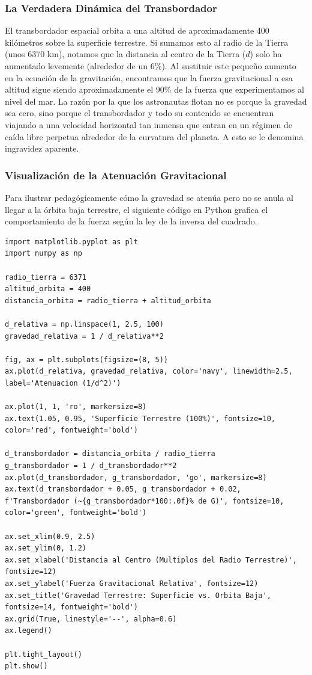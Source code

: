 \documentclass[12pt]{article}
\begin{document}
\subsubsection*{La Verdadera Dinámica del Transbordador}
El transbordador espacial orbita a una altitud de aproximadamente 400 kilómetros sobre la superficie terrestre. Si sumamos esto al radio de la Tierra (unos 6370 km), notamos que la distancia al centro de la Tierra ($d$) solo ha aumentado levemente (alrededor de un 6\%). Al sustituir este pequeño aumento en la ecuación de la gravitación, encontramos que la fuerza gravitacional a esa altitud sigue siendo aproximadamente el 90\% de la fuerza que experimentamos al nivel del mar.
La razón por la que los astronautas flotan no es porque la gravedad sea cero, sino porque el transbordador y todo su contenido se encuentran viajando a una velocidad horizontal tan inmensa que entran en un régimen de caída libre perpetua alrededor de la curvatura del planeta. A esto se le denomina ingravidez aparente.

\subsubsection*{Visualización de la Atenuación Gravitacional}
Para ilustrar pedagógicamente cómo la gravedad se atenúa pero no se anula al llegar a la órbita baja terrestre, el siguiente código en Python grafica el comportamiento de la fuerza según la ley de la inversa del cuadrado.

\begin{lstlisting}
import matplotlib.pyplot as plt
import numpy as np

radio_tierra = 6371
altitud_orbita = 400
distancia_orbita = radio_tierra + altitud_orbita

d_relativa = np.linspace(1, 2.5, 100)
gravedad_relativa = 1 / d_relativa**2

fig, ax = plt.subplots(figsize=(8, 5))
ax.plot(d_relativa, gravedad_relativa, color='navy', linewidth=2.5, label='Atenuacion (1/d^2)')

ax.plot(1, 1, 'ro', markersize=8)
ax.text(1.05, 0.95, 'Superficie Terrestre (100%)', fontsize=10, color='red', fontweight='bold')

d_transbordador = distancia_orbita / radio_tierra
g_transbordador = 1 / d_transbordador**2
ax.plot(d_transbordador, g_transbordador, 'go', markersize=8)
ax.text(d_transbordador + 0.05, g_transbordador + 0.02, f'Transbordador (~{g_transbordador*100:.0f}% de G)', fontsize=10, color='green', fontweight='bold')

ax.set_xlim(0.9, 2.5)
ax.set_ylim(0, 1.2)
ax.set_xlabel('Distancia al Centro (Multiplos del Radio Terrestre)', fontsize=12)
ax.set_ylabel('Fuerza Gravitacional Relativa', fontsize=12)
ax.set_title('Gravedad Terrestre: Superficie vs. Orbita Baja', fontsize=14, fontweight='bold')
ax.grid(True, linestyle='--', alpha=0.6)
ax.legend()

plt.tight_layout()
plt.show()
\end{lstlisting}
\end{document}
